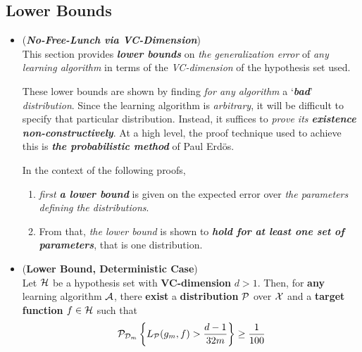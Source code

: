 \documentclass[11pt]{article}
\begin{document}
\subsection{Lower Bounds}
\begin{itemize}
\item \begin{remark} (\emph{\textbf{No-Free-Lunch via VC-Dimension}})\\
This section provides \emph{\textbf{lower bounds}} on \emph{the generalization error} of \emph{any learning algorithm} in terms of the \emph{VC-dimension} of the hypothesis set used.

These lower bounds are shown by finding \emph{for any algorithm} a `\emph{\textbf{bad}}' \emph{distribution}. Since the learning algorithm is \emph{arbitrary}, it will be difficult to specify that particular distribution. Instead, it suffices to \emph{prove its \textbf{existence} \textbf{non-constructively}}. At a high level, the proof technique used to achieve this is \emph{\textbf{the probabilistic method}} of Paul Erd\"os. 

In the context of the following proofs, 
\begin{enumerate}
\item \emph{first} \emph{\textbf{a lower bound}} is given on the expected error over \emph{the parameters defining the distributions}.

\item  From that, \emph{the lower bound} is shown to \emph{\textbf{hold for at least one set of parameters}}, that is one distribution.
\end{enumerate}
\end{remark}

\item \begin{proposition} (\textbf{Lower Bound, Deterministic Case}) \citep{mohri2018foundations}\\
Let ${\mathcal H}$ be a hypothesis set with \textbf{VC-dimension} $d > 1$. Then, for \textbf{any} learning algorithm ${\mathcal A}$, there \textbf{exist} a \textbf{distribution} ${\mathcal P}$ over ${\mathcal X}$ and a \textbf{target function} $f \in {\mathcal H}$ such that
\begin{align*}
{\mathcal P}_{{\mathcal D}_m}\left\{L_{{\mathcal P}}(g_{m}, f) > \frac{d-1}{32 m}\right\} \ge \frac{1}{100}
\end{align*}
\end{proposition}


\end{itemize}
\end{document}

